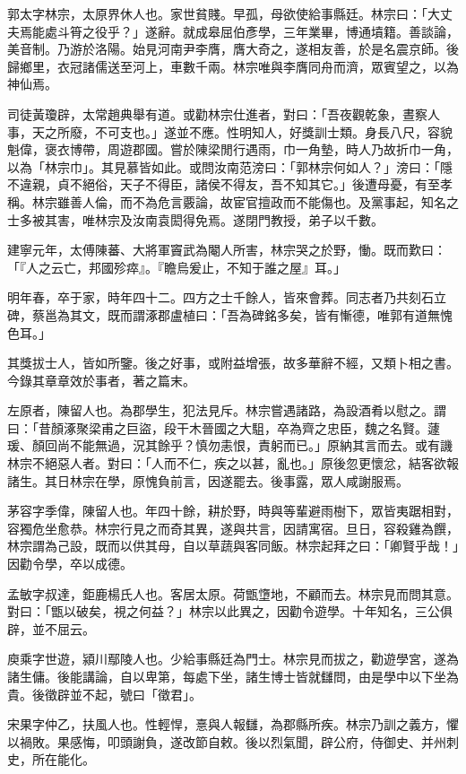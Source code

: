 
\begin{pinyinscope}
郭太字林宗，太原界休人也。家世貧賤。早孤，母欲使給事縣廷。林宗曰：「大丈夫焉能處斗筲之役乎？」遂辭。就成皋屈伯彥學，三年業畢，博通墳籍。善談論，美音制。乃游於洛陽。始見河南尹李膺，膺大奇之，遂相友善，於是名震京師。後歸鄉里，衣冠諸儒送至河上，車數千兩。林宗唯與李膺同舟而濟，眾賓望之，以為神仙焉。

司徒黃瓊辟，太常趙典舉有道。或勸林宗仕進者，對曰：「吾夜觀乾象，晝察人事，天之所廢，不可支也。」遂並不應。性明知人，好獎訓士類。身長八尺，容貌魁偉，褒衣博帶，周遊郡國。嘗於陳梁閒行遇雨，巾一角墊，時人乃故折巾一角，以為「林宗巾」。其見慕皆如此。或問汝南范滂曰：「郭林宗何如人？」滂曰：「隱不違親，貞不絕俗，天子不得臣，諸侯不得友，吾不知其它。」後遭母憂，有至孝稱。林宗雖善人倫，而不為危言覈論，故宦官擅政而不能傷也。及黨事起，知名之士多被其害，唯林宗及汝南袁閎得免焉。遂閉門教授，弟子以千數。

建寧元年，太傅陳蕃、大將軍竇武為閹人所害，林宗哭之於野，慟。既而歎曰：「『人之云亡，邦國殄瘁』。『瞻烏爰止，不知于誰之屋』耳。」

明年春，卒于家，時年四十二。四方之士千餘人，皆來會葬。同志者乃共刻石立碑，蔡邕為其文，既而謂涿郡盧植曰：「吾為碑銘多矣，皆有慚德，唯郭有道無愧色耳。」

其獎拔士人，皆如所鑒。後之好事，或附益增張，故多華辭不經，又類卜相之書。今錄其章章效於事者，著之篇末。

左原者，陳留人也。為郡學生，犯法見斥。林宗嘗遇諸路，為設酒肴以慰之。謂曰：「昔顏涿聚梁甫之巨盜，段干木晉國之大駔，卒為齊之忠臣，魏之名賢。蘧瑗、顏回尚不能無過，況其餘乎？慎勿恚恨，責躬而已。」原納其言而去。或有譏林宗不絕惡人者。對曰：「人而不仁，疾之以甚，亂也。」原後忽更懷忿，結客欲報諸生。其日林宗在學，原愧負前言，因遂罷去。後事露，眾人咸謝服焉。

茅容字季偉，陳留人也。年四十餘，耕於野，時與等輩避雨樹下，眾皆夷踞相對，容獨危坐愈恭。林宗行見之而奇其異，遂與共言，因請寓宿。旦日，容殺雞為饌，林宗謂為己設，既而以供其母，自以草蔬與客同飯。林宗起拜之曰：「卿賢乎哉！」因勸令學，卒以成德。

孟敏字叔達，鉅鹿楊氏人也。客居太原。荷甑墯地，不顧而去。林宗見而問其意。對曰：「甑以破矣，視之何益？」林宗以此異之，因勸令遊學。十年知名，三公俱辟，並不屈云。

庾乘字世遊，潁川鄢陵人也。少給事縣廷為門士。林宗見而拔之，勸遊學宮，遂為諸生傭。後能講論，自以卑第，每處下坐，諸生博士皆就讎問，由是學中以下坐為貴。後徵辟並不起，號曰「徵君」。

宋果字仲乙，扶風人也。性輕悍，憙與人報讎，為郡縣所疾。林宗乃訓之義方，懼以禍敗。果感悔，叩頭謝負，遂改節自敕。後以烈氣聞，辟公府，侍御史、并州刺史，所在能化。


\end{pinyinscope}
